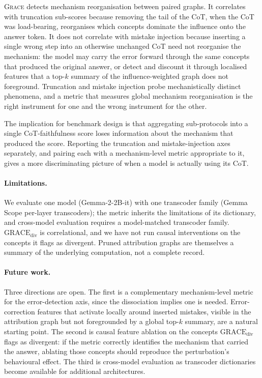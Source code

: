 \documentclass{article}
\newcommand{\GRACE}{\textsc{Grace}}
\newcommand{\gdiv}{\mathrm{GRACE}_{\text{div}}}
\begin{document}
\GRACE{} detects mechanism reorganisation between paired graphs. It
correlates with truncation sub-scores because removing the tail of
the CoT, when the CoT was load-bearing, reorganises which concepts
dominate the influence onto the answer token. It does not correlate
with mistake injection because inserting a single wrong step into an
otherwise unchanged CoT need not reorganise the mechanism: the model
may carry the error forward through the same concepts that produced
the original answer, or detect and discount it through localised
features that a top-$k$ summary of the influence-weighted graph does
not foreground. Truncation and mistake injection probe mechanistically
distinct phenomena, and a metric that measures global mechanism
reorganisation is the right instrument for one and the wrong
instrument for the other.

The implication for benchmark design is that aggregating sub-protocols
into a single CoT-faithfulness score loses information about the
mechanism that produced the score. Reporting the truncation and
mistake-injection axes separately, and pairing each with a
mechanism-level metric appropriate to it, gives a more discriminating
picture of when a model is actually using its CoT.

\paragraph{Limitations.}
We evaluate one model (Gemma-2-2B-it) with one transcoder family
(Gemma Scope per-layer transcoders); the metric inherits the
limitations of its dictionary, and cross-model evaluation requires a
model-matched transcoder family. $\gdiv$ is correlational, and we have
not run causal interventions on the concepts it flags as divergent.
Pruned attribution graphs are themselves a summary of the underlying
computation, not a complete record.

\paragraph{Future work.}
Three directions are open. The first is a complementary mechanism-level
metric for the error-detection axis, since the dissociation implies
one is needed. Error-correction features that activate locally around
inserted mistakes, visible in the attribution graph but not foregrounded
by a global top-$k$ summary, are a natural starting point. The second
is causal feature ablation on the concepts $\gdiv$ flags as divergent:
if the metric correctly identifies the mechanism that carried the
answer, ablating those concepts should reproduce the perturbation's
behavioural effect. The third is cross-model evaluation as transcoder
dictionaries become available for additional architectures.
\end{document}
